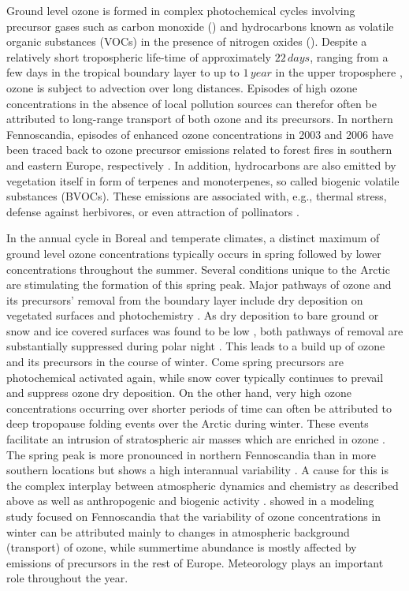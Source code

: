 \documentclass[bg, manuscript]{copernicus}
\begin{document}
Ground level ozone is formed in complex photochemical cycles involving precursor gases such as carbon monoxide () and hydrocarbons known as volatile organic substances (VOCs) in the presence of nitrogen oxides (). Despite a relatively short tropospheric life-time of approximately $22\,\unit{days}$, ranging from a few days in the tropical boundary layer to up to $1\,\unit{year}$ in the upper troposphere \citep{JGR:Stevenson2005,ACP:Young2013}, ozone is subject to advection over long distances. Episodes of high ozone concentrations in the absence of local pollution sources can therefor often be attributed to long-range transport of both ozone and its precursors. In northern Fennoscandia, episodes of enhanced ozone concentrations in 2003 and 2006 have been traced back to ozone precursor emissions related to forest fires in southern and eastern Europe, respectively \citep{AE:Lindskog2007,EP:Karlsson2013}. In addition, hydrocarbons are also emitted by vegetation itself in form of terpenes and monoterpenes, so called biogenic volatile substances (BVOCs). These emissions are associated with, e.g., thermal stress, defense against herbivores, or even attraction of pollinators \citep{TPS:Penuelas2003}. 

In the annual cycle in Boreal and temperate climates, a distinct maximum of ground level ozone concentrations typically occurs in spring followed by lower concentrations throughout the summer. Several conditions unique to the Arctic are stimulating the formation of this spring peak. Major pathways of ozone and its precursors' removal from the boundary layer include dry deposition on vegetated surfaces and photochemistry \citep{RG:Clifton2020}. As dry deposition to bare ground or snow and ice covered surfaces was found to be low \citep{ACP:Helmig2007}, both pathways of removal are substantially suppressed during polar night \citep{AE:Monks2000}. This leads to a build up of ozone and its precursors in the course of winter. Come spring precursors are photochemical activated again, while snow cover typically continues to prevail and suppress ozone dry deposition.
On the other hand, very high ozone concentrations occurring over shorter periods of time can often be attributed to deep tropopause folding events over the Arctic during winter. These events facilitate an intrusion of stratospheric air masses which are enriched in ozone \citep{JGR:Skerlak2015}.
The spring peak is more pronounced in northern Fennoscandia than in more southern locations but shows a  high interannual variability \citep{AB:Klingberg2009, BER:Klingberg2019}. A cause for this is the complex interplay between atmospheric dynamics and chemistry \citep{AE:Laurila1996,BER:Hatakka2003} as described above as well as anthropogenic and biogenic activity \citep{AE:Rummukainen1996,AE:Simpson2002,QJRMS:Galbally2007,NGS:Schnell2009}. \citet{ACP:Andersson2017} showed in a modeling study focused on Fennoscandia that the variability of ozone concentrations in winter can be attributed mainly to changes in atmospheric background (transport) of ozone, while summertime abundance is mostly affected by emissions of precursors in the rest of Europe. Meteorology plays an important role throughout the year.
\end{document}
